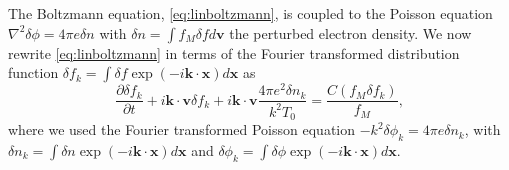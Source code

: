 %
The Boltzmann equation, \cref{eq:linboltzmann}, is coupled to the Poisson equation $\nabla^2 \delta \phi= 4\pi e \delta n$ with $\delta n=\int f_M \delta f d \mathbf v$ the perturbed electron density.
%
We now rewrite \cref{eq:linboltzmann} in terms of the Fourier transformed distribution function $\delta f_k=\int \delta f \exp({-i \mathbf k \cdot \mathbf x}) d\mathbf{x}$ as
%
\begin{equation}
    \frac{\partial \delta f_k}{\partial t} + i \mathbf k \cdot \mathbf v \delta f_k+i \mathbf k \cdot \mathbf v \frac{4 \pi e^2 \delta n_k}{k^2 T_0} = \frac{C(f_M \delta f_k)}{f_M},
\label{eq:fourgyrolinboltzmann}
\end{equation}
%
where we used the Fourier transformed Poisson equation $-k^2 \delta \phi_k = 4 \pi e \delta n_k$, with $\delta n_k=\int \delta n \exp({-i \mathbf k \cdot \mathbf x}) d\mathbf{x}$ and $\delta \phi_k=\int \delta \phi \exp({-i \mathbf k \cdot \mathbf x}) d\mathbf{x}$.

